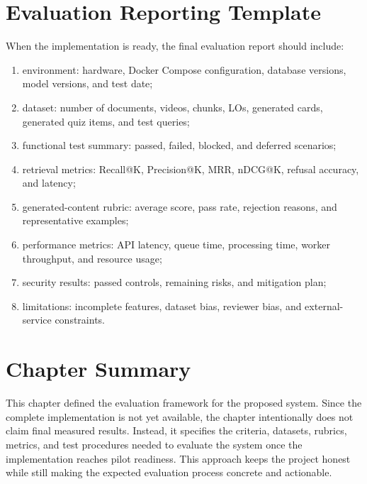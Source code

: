 \section{Evaluation Reporting Template}

When the implementation is ready, the final evaluation report should include:

\begin{enumerate}
    \item environment: hardware, Docker Compose configuration, database
          versions, model versions, and test date;
    \item dataset: number of documents, videos, chunks, LOs, generated cards,
          generated quiz items, and test queries;
    \item functional test summary: passed, failed, blocked, and deferred
          scenarios;
    \item retrieval metrics: Recall@K, Precision@K, MRR, nDCG@K, refusal
          accuracy, and latency;
    \item generated-content rubric: average score, pass rate, rejection
          reasons, and representative examples;
    \item performance metrics: API latency, queue time, processing time,
          worker throughput, and resource usage;
    \item security results: passed controls, remaining risks, and mitigation
          plan;
    \item limitations: incomplete features, dataset bias, reviewer bias, and
          external-service constraints.
\end{enumerate}

\section{Chapter Summary}

This chapter defined the evaluation framework for the proposed system. Since
the complete implementation is not yet available, the chapter intentionally
does not claim final measured results. Instead, it specifies the criteria,
datasets, rubrics, metrics, and test procedures needed to evaluate the system
once the implementation reaches pilot readiness. This approach keeps the project
honest while still making the expected evaluation process concrete and
actionable.
